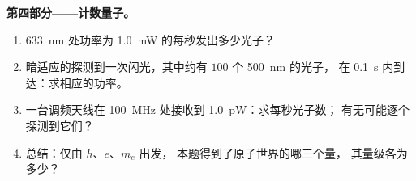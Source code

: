 \begin{problem}
\medskip
\noindent\textbf{第四部分——计数量子。}
\begin{enumerate}[resume]
  \item \qty{633}{nm} 处功率为 \qty{1.0}{mW} 的每秒发出多少光子？
  \item 暗适应的探测到一次闪光，其中约有 $100$ 个 \qty{500}{nm} 的光子，
        在 \qty{0.1}{s} 内到达：求相应的功率。
  \item 一台调频天线在 \qty{100}{MHz} 处接收到 \qty{1.0}{pW}：求每秒光子数；
        有无可能逐个探测到它们？
  \item 总结：仅由 $h$、$e$、$m_e$ 出发，
        本题得到了原子世界的哪三个量，
        其量级各为多少？
\end{enumerate}
\end{problem}

